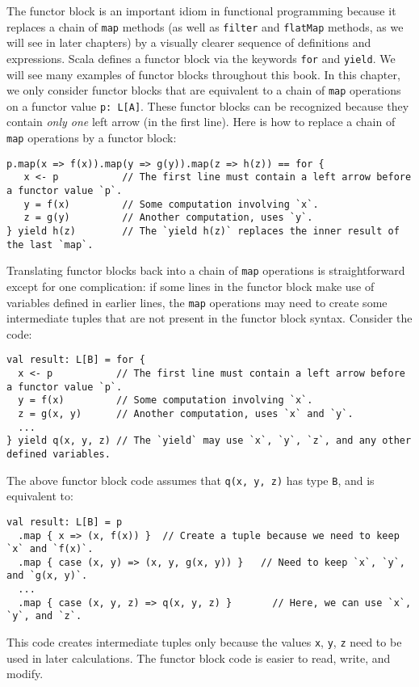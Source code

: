 The functor block is an important idiom in functional programming
because it replaces a chain of \lstinline!map! methods (as well as
\lstinline!filter! and \lstinline!flatMap! methods, as we will see
in later chapters) by a visually clearer sequence of definitions and
expressions. Scala defines a functor block via the keywords \lstinline!for!
and \lstinline!yield!. We will see many examples of functor blocks
throughout this book. In this chapter, we only consider functor blocks
that are equivalent to a chain of \lstinline!map! operations on a
functor value \lstinline!p: L[A]!. These functor blocks can be recognized
because they contain \emph{only one} left arrow (in the first line).
Here is how to replace a chain of \lstinline!map! operations by a
functor block:
\begin{lstlisting}
p.map(x => f(x)).map(y => g(y)).map(z => h(z)) == for {
   x <- p           // The first line must contain a left arrow before a functor value `p`.
   y = f(x)         // Some computation involving `x`.
   z = g(y)         // Another computation, uses `y`.
} yield h(z)        // The `yield h(z)` replaces the inner result of the last `map`.
\end{lstlisting}
Translating functor blocks back into a chain of \lstinline!map! operations
is straightforward except for one complication: if some lines in the
functor block make use of variables defined in earlier lines, the
\lstinline!map! operations may need to create some intermediate tuples
that are not present in the functor block syntax. Consider the code:
\begin{lstlisting}
val result: L[B] = for {
  x <- p           // The first line must contain a left arrow before a functor value `p`.
  y = f(x)         // Some computation involving `x`.
  z = g(x, y)      // Another computation, uses `x` and `y`.
  ...
} yield q(x, y, z) // The `yield` may use `x`, `y`, `z`, and any other defined variables.
\end{lstlisting}
The above functor block code assumes that \lstinline!q(x, y, z)!
has type \lstinline!B!, and is equivalent to:
\begin{lstlisting}
val result: L[B] = p
  .map { x => (x, f(x)) }  // Create a tuple because we need to keep `x` and `f(x)`.
  .map { case (x, y) => (x, y, g(x, y)) }   // Need to keep `x`, `y`, and `g(x, y)`.
  ...
  .map { case (x, y, z) => q(x, y, z) }       // Here, we can use `x`, `y`, and `z`.
\end{lstlisting}
This code creates intermediate tuples only because the values \lstinline!x!,
\lstinline!y!, \lstinline!z! need to be used in later calculations.
The functor block code is easier to read, write, and modify. 

